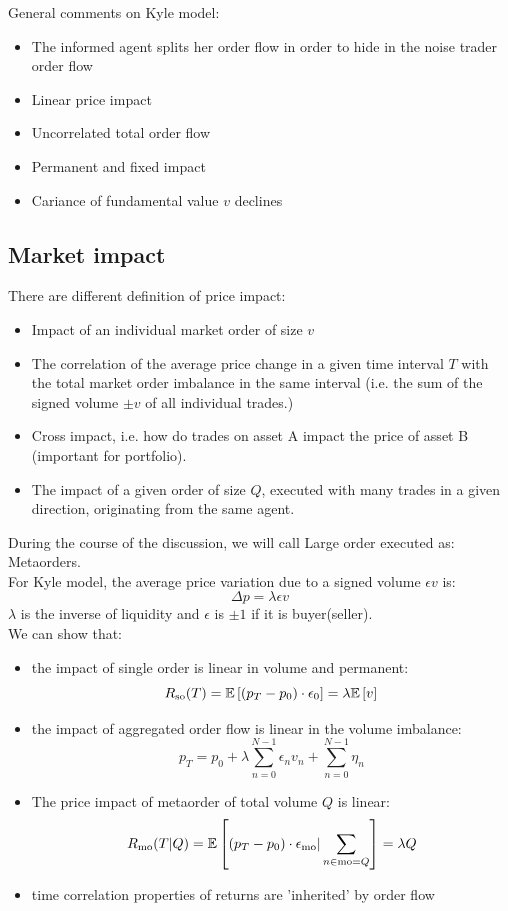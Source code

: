 \newpage
General comments on Kyle model:
\begin{itemize}
	\item The informed agent splits her order flow in order to hide in the noise trader order flow
	\item Linear price impact
	\item Uncorrelated total order flow
	\item Permanent and fixed impact
	\item Cariance of fundamental value $v$ declines
\end{itemize}
\subsection{Market impact}
There are different definition of price impact:
\begin{itemize}
	\item Impact of an individual market order of size $v$
	\item The correlation of the average price change in a given time interval $T$ with the total
	market order imbalance in the same interval (i.e. the sum of the signed volume $\pm v$ of all individual trades.)
	\item Cross impact, i.e. how do trades on asset A impact the price of asset B (important for portfolio).
	\item The impact of a given order of size $Q$, executed with many trades in a given direction, originating from the same agent.
\end{itemize}
During the course of the discussion, we will call Large order executed as: Metaorders.\\
For Kyle model, the average price variation due to a signed volume $\epsilon v$ is:
\[
\Delta p = \lambda \epsilon v
\]
$\lambda$ is the inverse of liquidity and $\epsilon$ is $\pm 1$ if it is buyer(seller).\\ We can show that:
\begin{itemize}
	\item the impact of single order is linear in volume and permanent:
	\[
	R_{\text{so}}(T) = \mathbb{E}\left[(p_T - p_0)\cdot \epsilon_0\right] = \lambda \mathbb{E}\left[v\right]
	\]
	\item the impact of aggregated order flow is linear in the volume imbalance:
	\[
	p_T = p_0 + \lambda \sum_{n=0}^{N-1} \epsilon_nv_n + \sum_{n = 0}^{N-1} \eta_n
	\]
	\item The price impact of metaorder of total volume $Q$ is linear:
	\[
	R_{\text{mo}}(T|Q) = \mathbb{E}\left[(p_T - p_0) \cdot \epsilon_{\text{mo}}| \sum_{n \in \text{mo} = Q}\right] = \lambda Q
	\]
	\item time correlation properties of returns are 'inherited' by order flow
\end{itemize}
